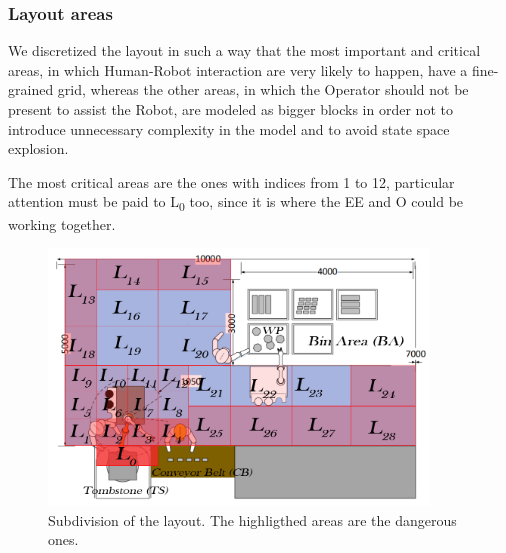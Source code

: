 \documentclass[a4paper]{article}
\begin{document}




\subsubsection{Layout areas}
We discretized the layout in such a way that the most important and critical areas, in which Human-Robot interaction are very likely to happen, have a fine-grained grid, whereas the other areas, in which the Operator should not be present to assist the Robot, are modeled as bigger blocks in order not to introduce unnecessary complexity in the model and to avoid state space explosion.

The most critical areas are the ones with indices from 1 to 12, particular attention must be paid to L\textsubscript0 too, since it is where the EE and O could be working together. 

\begin{figure}[htp] 
\includegraphics[width=0.9\textwidth]{images/layoutnames} 
\caption{Subdivision of the layout. The highligthed areas are the dangerous ones.} 
\label{fig:layout2} 
\end{figure}
\end{document}
